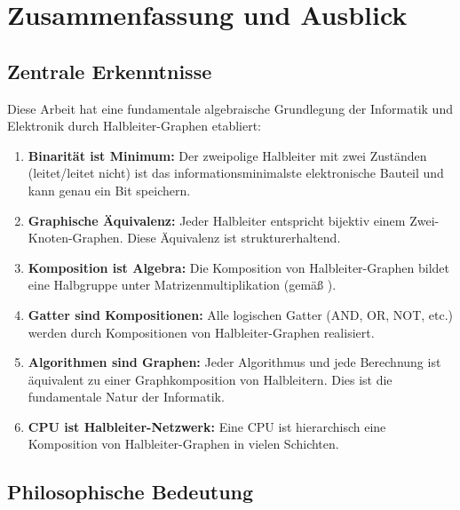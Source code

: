 \documentclass[12pt, a4paper]{article}
\theoremstyle{definition}
\theoremstyle{remark}
\begin{document}
\section{Zusammenfassung und Ausblick}
\label{sec:ausblick}

\subsection{Zentrale Erkenntnisse}
\label{subsec:erkenntnisse}

Diese Arbeit hat eine fundamentale algebraische Grundlegung der Informatik und Elektronik durch Halbleiter-Graphen etabliert:

\begin{enumerate}[label=(\roman*)]
  \item \textbf{Binarität ist Minimum:} Der zweipolige Halbleiter mit zwei Zuständen (leitet/leitet nicht) ist das informationsminimalste elektronische Bauteil und kann genau ein Bit speichern.

  \item \textbf{Graphische Äquivalenz:} Jeder Halbleiter entspricht bijektiv einem Zwei-Knoten-Graphen. Diese Äquivalenz ist strukturerhaltend.

  \item \textbf{Komposition ist Algebra:} Die Komposition von Halbleiter-Graphen bildet eine Halbgruppe unter Matrizenmultiplikation (gemäß \cite{epp2026matrgraph}).

  \item \textbf{Gatter sind Kompositionen:} Alle logischen Gatter (AND, OR, NOT, etc.) werden durch Kompositionen von Halbleiter-Graphen realisiert.

  \item \textbf{Algorithmen sind Graphen:} Jeder Algorithmus und jede Berechnung ist äquivalent zu einer Graphkomposition von Halbleitern. Dies ist die fundamentale Natur der Informatik.

  \item \textbf{CPU ist Halbleiter-Netzwerk:} Eine CPU ist hierarchisch eine Komposition von Halbleiter-Graphen in vielen Schichten.
\end{enumerate}

\subsection{Philosophische Bedeutung}
\label{subsec:philosophie}
\end{document}
